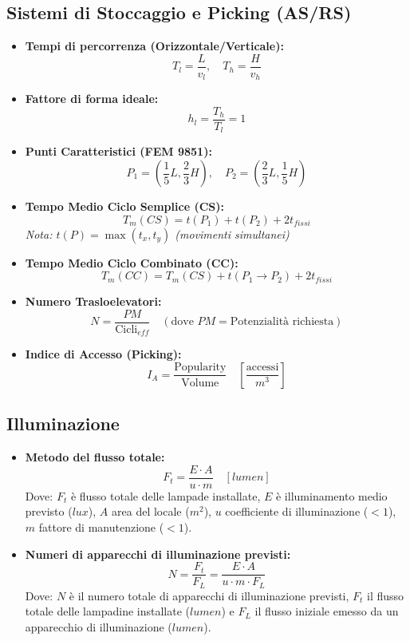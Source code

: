 \subsection*{Sistemi di Stoccaggio e Picking (AS/RS)}
\begin{itemize}
    \item \textbf{Tempi di percorrenza (Orizzontale/Verticale):}
          \[
              T_l = \frac{L}{v_l}, \quad T_h = \frac{H}{v_h}
          \]

    \item \textbf{Fattore di forma ideale:}
          \[
              h_l = \frac{T_h}{T_l} = 1
          \]

    \item \textbf{Punti Caratteristici (FEM 9851):}
          \[
              P_1 = \left(\frac{1}{5}L, \frac{2}{3}H\right), \quad P_2 = \left(\frac{2}{3}L, \frac{1}{5}H\right)
          \]

    \item \textbf{Tempo Medio Ciclo Semplice (CS):}
          \[
              T_m(CS) = t(P_1) + t(P_2) + 2t_{fissi}
          \]
          \emph{Nota: $t(P) = \max(t_x, t_y)$ (movimenti simultanei)}

    \item \textbf{Tempo Medio Ciclo Combinato (CC):}
          \[
              T_m(CC) = T_m(CS) + t(P_1 \to P_2) + 2t_{fissi}
          \]

    \item \textbf{Numero Trasloelevatori:}
          \[
              N = \frac{PM}{\text{Cicli}_{eff}} \quad (\text{dove } PM = \text{Potenzialità richiesta})
          \]

    \item \textbf{Indice di Accesso (Picking):}
          \[
              I_A = \frac{\text{Popularity}}{\text{Volume}} \quad \left[\frac{\text{accessi}}{m^3}\right]
          \]
\end{itemize}

%
\subsection*{Illuminazione}
\begin{itemize}
    \item \textbf{Metodo del flusso totale:}
          \[
              F_{t} = \frac{E \cdot A}{u \cdot m} \quad [\si{lumen}]
          \]
          Dove: $ F_{t} $ è flusso totale delle lampade installate, $ E $ è illuminamento medio previsto ($ \si{lux} $), $ A $ area del locale ($ \si{m^2} $), $ u $ coefficiente di illuminazione ($ < 1 $), $ m $ fattore di manutenzione ($ < 1 $).
    \item \textbf{Numeri di apparecchi di illuminazione previsti:}
          \[
              N = \frac{F_{t}}{F_{L}} = \frac{E \cdot A}{u \cdot m \cdot F_{L}}
          \]
          Dove: $ N $ è il numero totale di apparecchi di illuminazione previsti, $ F_{t} $ il flusso totale delle lampadine installate ($ \si{lumen} $) e $ F_{L} $ il flusso iniziale emesso da un apparecchio di illuminazione ($ \si{lumen} $).
\end{itemize}
